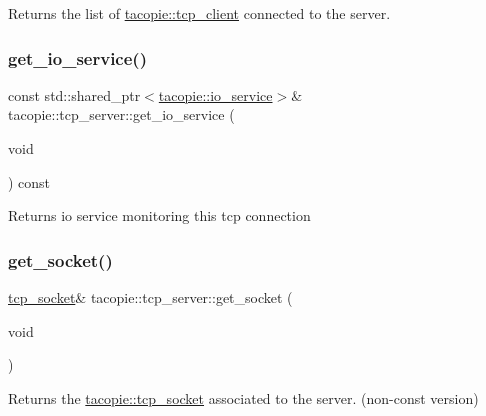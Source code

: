 \begin{DoxyReturn}{Returns}
the list of \hyperlink{classtacopie_1_1tcp__client}{tacopie\+::tcp\+\_\+client} connected to the server. 
\end{DoxyReturn}
\mbox{\label{classtacopie_1_1tcp__server_aace4796627b6abccccce1a541908414f}} 
\subsubsection{\texorpdfstring{get\+\_\+io\+\_\+service()}{get\_io\_service()}}
{\footnotesize\ttfamily const std\+::shared\+\_\+ptr$<$\hyperlink{classtacopie_1_1io__service}{tacopie\+::io\+\_\+service}$>$\& tacopie\+::tcp\+\_\+server\+::get\+\_\+io\+\_\+service (\begin{DoxyParamCaption}\item[{void}]{ }\end{DoxyParamCaption}) const}

\begin{DoxyReturn}{Returns}
io service monitoring this tcp connection 
\end{DoxyReturn}
\mbox{\label{classtacopie_1_1tcp__server_a39a51b9203d42babfd9c4c1a0f4cc340}} 
\subsubsection{\texorpdfstring{get\+\_\+socket()}{get\_socket()}\hspace{0.1cm}{\footnotesize\ttfamily [1/2]}}
{\footnotesize\ttfamily \hyperlink{classtacopie_1_1tcp__socket}{tcp\+\_\+socket}\& tacopie\+::tcp\+\_\+server\+::get\+\_\+socket (\begin{DoxyParamCaption}\item[{void}]{ }\end{DoxyParamCaption})}

\begin{DoxyReturn}{Returns}
the \hyperlink{classtacopie_1_1tcp__socket}{tacopie\+::tcp\+\_\+socket} associated to the server. (non-\/const version) 
\end{DoxyReturn}
\mbox{\label{classtacopie_1_1tcp__server_a373aec294e24a52c3ef6c44920af36e2}} 
